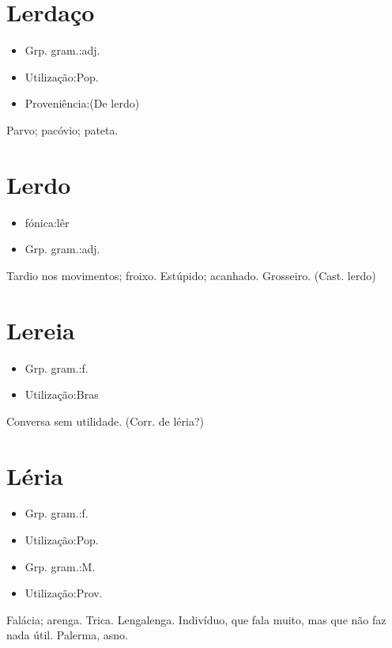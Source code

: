 \section{Lerdaço}
\begin{itemize}
\item {Grp. gram.:adj.}
\end{itemize}
\begin{itemize}
\item {Utilização:Pop.}
\end{itemize}
\begin{itemize}
\item {Proveniência:(De \textunderscore lerdo\textunderscore )}
\end{itemize}
Parvo; pacóvio; pateta.
\section{Lerdo}
\begin{itemize}
\item {fónica:lêr}
\end{itemize}
\begin{itemize}
\item {Grp. gram.:adj.}
\end{itemize}
Tardio nos movimentos; froixo.
Estúpido; acanhado.
Grosseiro.
(Cast. \textunderscore lerdo\textunderscore )
\section{Lereia}
\begin{itemize}
\item {Grp. gram.:f.}
\end{itemize}
\begin{itemize}
\item {Utilização:Bras}
\end{itemize}
Conversa sem utilidade.
(Corr. de \textunderscore léria\textunderscore ?)
\section{Léria}
\begin{itemize}
\item {Grp. gram.:f.}
\end{itemize}
\begin{itemize}
\item {Utilização:Pop.}
\end{itemize}
\begin{itemize}
\item {Grp. gram.:M.}
\end{itemize}
\begin{itemize}
\item {Utilização:Prov.}
\end{itemize}
Falácia; arenga.
Trica.
Lengalenga.
Indivíduo, que fala muito, mas que não faz nada útil.
Palerma, asno.
